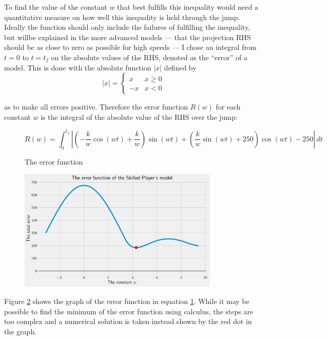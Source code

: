 To find the value of the constant $w$ that best fulfills this inequality would need a quantitative measure on how well this inequality is held through the jump. Ideally the function should only include the failures of fulfilling the inequality, but willbe explained in the more advanced models --- that the projection RHS should be as close to zero as possible for high speeds --- I chose an integral from $t=0$ to $t=t_f$ on the absolute values of the RHS, denoted as the ``error'' of a model. This is done with the absolute function $|x|$ defined by
\[
 |x| = \begin{cases}
         x & x \geq 0\\
         -x & x < 0
        \end{cases}
\]

as to make all errors positive. Therefore the error function $R(w)$ for each constant $w$ is the integral of the absolute value of the RHS over the jump:
\begin{figure}[H]
 \centering
 \[
  R(w) = \int_0^{t_f} \left|\left(-\frac{k}{w} \cos(wt) + \frac{k}{w}\right) \sin(wt) + \left(\frac{k}{w} \sin(wt) + 250\right) \cos(wt) - 250\right| \, dt
 \]
 \caption{The error function}
 \label{eq:2error}
\end{figure}


\begin{figure}[H]
 \centering
 \includegraphics[width=0.85\textwidth]{assets/restriction_equation.png}
 \caption{}
 \label{fig:2error}
\end{figure}
Figure \ref{fig:2error} shows the graph of the error function in equation \ref{eq:2error}. While it may be possible to find the minimum of the error function using calculus, the steps are too complex and a numerical solution is taken instead shown by the red dot in the graph.

